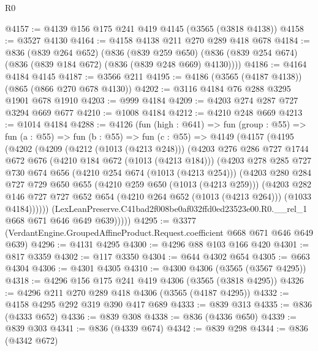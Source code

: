 \begin{lexlean}{R0}
\begin{coremodule}
@4157 := @4139 @156 @175 @241 @419 @4145 (@3565 (@3818 @4138))
@4158 := @3527 @4130
@4164 := @4158 @4138 @211 @270 @289 @418 @678
@4184 := @836
    (@839 @264 @652)
    (@836
      (@839 @259 @650)
      (@836 (@839 @254 @674) (@836 (@839 @184 @672) (@836 (@839 @248 @669) @4130))))
@4186 := @4164 @4184 @4145
@4187 := @3566 @211
@4195 := @4186 (@3565 (@4187 @4138)) (@865 (@866 @270 @678 @4130))
@4202 := @3116 @4184 @76 @288 @3295 @1901 @678 @1910
@4203 := @999 @4184
@4209 := @4203 @274 @287 @727 @3294 @669 @677
@4210 := @1008 @4184
@4212 := @4210 @248 @669
@4213 := @1014 @4184
@4288 := @4126
    (fun (high : @641) =>
    fun (group : @55) =>
    fun (a : @55) =>
    fun (b : @55) =>
    fun (c : @55) =>
    @4149
      (@4157
        (@4195
          (@4202
            (@4209
              (@4212 (@1013 (@4213 @248)))
              (@4203
                @276
                @286
                @727
                @1744
                @672
                @676
                (@4210 @184 @672 (@1013 (@4213 @184)))
                (@4203
                  @278
                  @285
                  @727
                  @730
                  @674
                  @656
                  (@4210 @254 @674 (@1013 (@4213 @254)))
                  (@4203
                    @280
                    @284
                    @727
                    @729
                    @650
                    @655
                    (@4210 @259 @650 (@1013 (@4213 @259)))
                    (@4203
                      @282
                      @146
                      @727
                      @727
                      @652
                      @654
                      (@4210 @264 @652 (@1013 (@4213 @264)))
                      (@1033 @4184))))))
            (LexLeanPreserve.C41bad2f008be0af032ffd0ed23523e00.R0.__rel_1
              @668
              @671
              @646
              @649
              @639)))))
@4295 := @3377 (VerdantEngine.GroupedAffineProduct.Request.coefficient @668 @671 @646 @649 @639)
@4296 := @4131 @4295
@4300 := @4296 @88 @103 @166 @420
@4301 := @817 @3359
@4302 := @117 @3350
@4304 := @644 @4302 @654
@4305 := @663 @4304
@4306 := @4301 @4305
@4310 := @4300 @4306 (@3565 (@3567 @4295))
@4318 := @4296 @156 @175 @241 @419 @4306 (@3565 (@3818 @4295))
@4326 := @4296 @211 @270 @289 @418 @4306 (@3565 (@4187 @4295))
@4332 := @4158 @4295 @292 @319 @390 @417 @689
@4333 := @839 @313
@4335 := @836 (@4333 @652)
@4336 := @839 @308
@4338 := @836 (@4336 @650)
@4339 := @839 @303
@4341 := @836 (@4339 @674)
@4342 := @839 @298
@4344 := @836 (@4342 @672)

\end{coremodule}
\end{lexlean}
